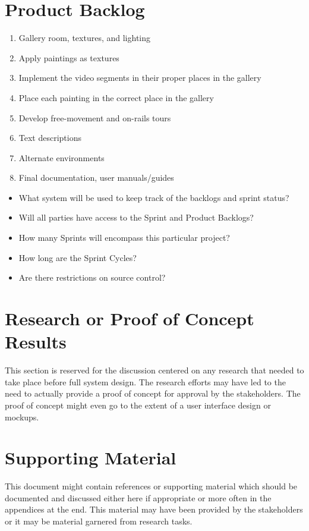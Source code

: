 \section{Product Backlog}
\begin{enumerate}
	\item Gallery room, textures, and lighting
	\item Apply paintings as textures
	\item Implement the video segments in their proper places in the gallery
	\item Place each painting in the correct place in the gallery
	\item Develop free-movement and on-rails tours
	\item Text descriptions
	\item Alternate environments
	\item Final documentation, user manuals/guides
\end{enumerate}
 
\begin{itemize}
\item What system will be used to keep track of the backlogs and sprint status?
\item Will all parties have access to the Sprint and Product Backlogs?
\item How many Sprints will encompass this particular project?
\item How long are the Sprint Cycles?
\item Are there restrictions on source control? 
\end{itemize}


\section{Research or Proof of Concept Results}
This section is reserved for the discussion centered on any research that needed 
to take place before full system design.  The research efforts may have led to 
the need to actually provide a proof of concept for approval by the stakeholders. 
 The proof of concept might even go to the extent of a user interface design or 
mockups. 


\section{Supporting Material}


This document might contain references or supporting material which should be documented 
and discussed  either here if appropriate or more often in the appendices at the end.  This material may have been provided by the stakeholders  
or it may be material garnered from research tasks.

